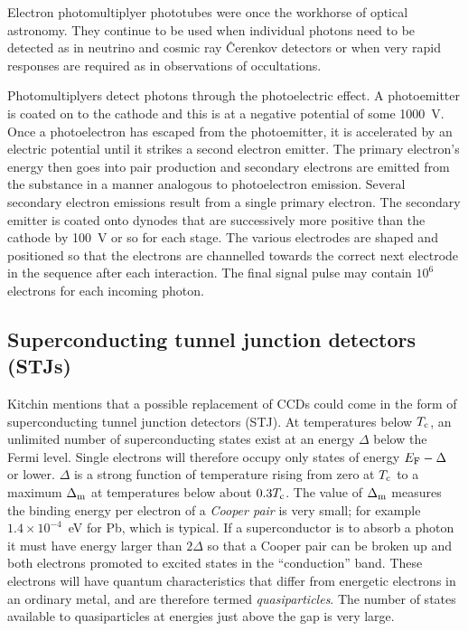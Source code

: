 Electron photomultiplyer phototubes were once the workhorse of optical 
astronomy. They continue to be used when individual photons need to be
detected  as in neutrino and cosmic ray \^Cerenkov detectors or when very
rapid responses are required as in observations of occultations.

Photomultiplyers detect photons through the photoelectric effect. A 
photoemitter is coated on to the cathode and this is at a negative potential
of some 1000~V. Once a photoelectron has escaped from the photoemitter, it
is accelerated by an electric potential until it strikes a second 
electron emitter. The primary electron's energy then goes into pair production
and secondary electrons are emitted from the substance in a manner analogous
to photoelectron emission. Several secondary electron emissions result 
from a single primary electron. The secondary emitter is coated onto dynodes
that are successively more positive than the cathode by 100~V or so for each
stage. The various electrodes are shaped and positioned so that the electrons
are channelled towards the correct next electrode in the sequence after 
each interaction. The final signal pulse may contain $10^6$ electrons for each
incoming photon. 

\subsection{Superconducting tunnel junction detectors (STJs)}

Kitchin mentions that a possible replacement of CCDs could come in the form
of superconducting tunnel junction detectors (STJ). At temperatures
below $T_{\rm c}$, an unlimited number of superconducting states exist
at an energy $\Delta$ below the Fermi level. Single electrons will
therefore occupy only states of energy $E_{\rm F}-\Delta$ or
  lower. $\Delta$ is a strong function of temperature rising from zero
  at $T_{\rm c}$ to a maximum $\Delta_{\rm m}$ at temperatures below
  about $0.3T_{\rm c}$. The value of $\Delta_{\rm m}$ measures the
  binding energy per electron of a {\it Cooper pair} is very small;
  for example $1.4\times 10^{-4}$~eV for Pb, which is typical. If a
  superconductor is to absorb a photon it must have energy larger than
  $2\Delta$ so that a Cooper pair can be broken up and both electrons
  promoted to excited states in the ``conduction'' band. These
  electrons will have quantum characteristics that differ from
  energetic electrons in an ordinary metal, and are therefore termed
  {\it quasiparticles}. The number of states available to
  quasiparticles at energies just above the gap is very large.

